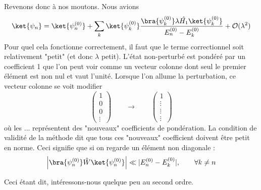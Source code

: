 		Revenons donc à nos moutons. Nous avions
		\begin{equation}
		\ket{\psi_n} = \ket{\psi_n^{(0)}} + \sum_k	\ket{\psi_k^{(0)}}\dfrac{\bra{\psi_k^{(0)}}\lambda\hat{H_1}
		\ket{\psi_k^{(0)}}}{E_n^{(0)}-E_k^{(0)}}  + 
		\mathcal{O}(\lambda^2)
		\end{equation}
		Pour quel cela fonctionne correctement, il faut que le terme correctionnel soit 
		relativement "petit" (et donc $\lambda$ petit). L'état non-perturbé est pondéré par un 
		coefficient 1 que l'on peut voir comme un vecteur colonne dont seul le premier élément 
		est non nul et vaut l'unité. Lorsque l'on allume la perturbation, ce vecteur colonne 
		se voit modifier 
		\begin{equation}
		\left(\begin{array}{c}
		1\\
		0\\
		0\\
		\vdots
		\end{array}\right)\qquad\rightarrow\qquad\left(\begin{array}{c}
		1\\
		\vdots\\
		\vdots\\
		\vdots
		\end{array}\right)
		\end{equation}
		où les $\dots$ représentent des "nouveaux" coefficients de pondération. La 
		condition de validité de la méthode dit que tous ces "nouveaux" coefficient 
		doivent être petit en norme. Ceci signifie que si on regarde un élément 
		non diagonale :
		\begin{equation}
		\left|\bra{\psi_n^{(0)}}\hat{W}\ket{\psi_n^{(0)}}\right| \ll |E_n^{(0)}-
		E_k^{(0)}|,\qquad \forall k \neq n
		\end{equation}
		
		Ceci étant dit, intéressons-nous quelque peu au second ordre.
		
